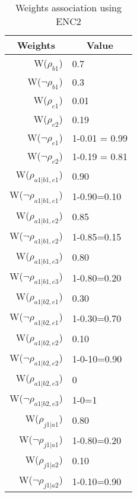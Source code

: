 \begin{table}[H]
\centering
\caption{Weights association using ENC2}
\label{weightsEnc2}
\begin{tabular}{rl}
\hline
\multicolumn{1}{c}{Weights} & \multicolumn{1}{c}{Value} \\ \hline
W(\(\rho_{b1}\)) & 0.7 \\
W(\(\neg\rho_{b1}\)) & 0.3 \\
W(\(\rho_{e1}\)) & 0.01 \\
W(\(\rho_{e2}\)) & 0.19 \\
W(\(\neg\rho_{e1}\)) & 1-0.01 = 0.99 \\
W(\(\neg\rho_{e2}\)) & 1-0.19 = 0.81 \\
W(\(\rho_{a1|b1,e1}\)) & 0.90 \\
W(\(\neg\rho_{a1|b1,e1}\)) & 1-0.90=0.10 \\
W(\(\rho_{a1|b1,e2}\)) & 0.85 \\
\multicolumn{1}{l}{W(\(\neg\rho_{a1|b1,e2}\))} & 1-0.85=0.15 \\
W(\(\rho_{a1|b1,e3}\)) & 0.80 \\
W(\(\neg\rho_{a1|b1,e3}\)) & 1-0.80=0.20 \\
W(\(\rho_{a1|b2,e1}\)) & 0.30 \\
W(\(\neg\rho_{a1|b2,e1}\)) & 1-0.30=0.70 \\
W(\(\rho_{a1|b2,e2}\)) & 0.10 \\
W(\(\neg\rho_{a1|b2,e2}\)) & 1-0-10=0.90 \\
W(\(\rho_{a1|b2,e3}\)) & 0 \\
W(\(\neg\rho_{a1|b2,e3}\)) & 1-0=1 \\
W(\(\rho_{j1|a1}\)) & 0.80 \\
W(\(\neg\rho_{j1|a1}\)) & 1-0.80=0.20 \\
W(\(\rho_{j1|a2}\)) & 0.10 \\
W(\(\neg\rho_{j1|a2}\)) & 1-0.10=0.90
\end{tabular}
\end{table}